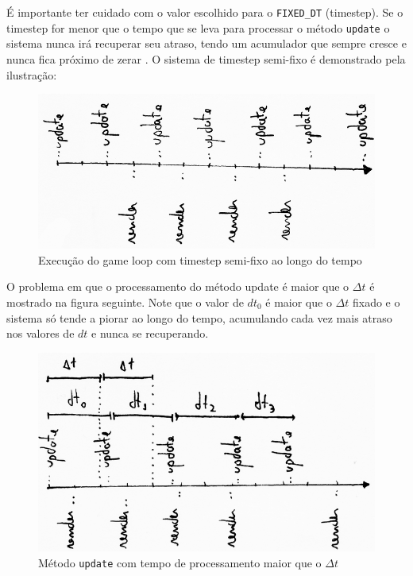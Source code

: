 \documentclass[12pt, 
openright, 
oneside, 
a4paper,    
brazil]{facom-ufu-abntex2}
\begin{document}
É importante ter cuidado com o valor escolhido para o \texttt{FIXED_DT} (timestep). Se o timestep for menor que o tempo que se leva para processar o método \texttt{update} o sistema nunca irá recuperar seu atraso, tendo um acumulador que sempre cresce e nunca fica próximo de zerar \cite{GameProgrammingPatterns}.
O sistema de timestep semi-fixo é demonstrado pela ilustração:
\begin{figure}[H]
	\centering
	\includegraphics[width=\textwidth]{imagens/ilu6_small.png}
	\caption{Execução do game loop com timestep semi-fixo ao longo do tempo}
\end{figure}
O problema em que o processamento do método update é maior que o $\Delta t$ é mostrado na figura seguinte. Note que o valor de $dt_0$ é maior que o $\Delta t$ fixado e o sistema só tende a piorar ao longo do tempo, acumulando cada vez mais atraso nos valores de $dt$ e nunca se recuperando.
\begin{figure}[H]
	\centering
	\includegraphics[width=\textwidth]{imagens/ilu8_small.png}
	\caption{Método \texttt{update} com tempo de processamento maior que o $\Delta t$}
\end{figure}
 
\end{document}

